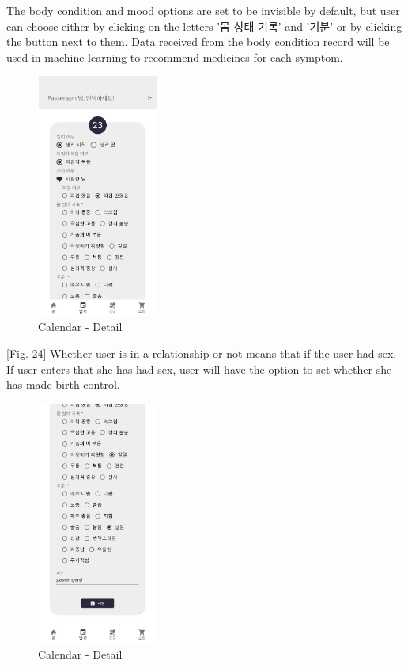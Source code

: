 \documentclass[conference]{IEEEtran}
\begin{document}
\begin{itemize}
\begin{enumerate}
        [Fig. 23] The body condition and mood options are set to be invisible by default, but user can choose either by clicking on the letters '몸 상태 기록' and '기분' or by clicking the button next to them. Data received from the body condition record will be used in machine learning to recommend medicines for each symptom.
        
        \begin{figure}[ht]
        \includegraphics[width=4cm, height=8cm, center]{calendar_detail4.png}
        \caption{Calendar - Detail}
        \label{fig24}
        \end{figure}

        [Fig. 24] Whether user is in a relationship or not means that if the user had sex. If user enters that she has had sex, user will have the option to set whether she has made birth control.
        
        \begin{figure}[ht]
        \includegraphics[width=4cm, height=8cm, center]{calendar_detail5.png}
        \caption{Calendar - Detail}
        \label{fig25}
        \end{figure}


\end{enumerate}
\end{itemize}
\end{document}
